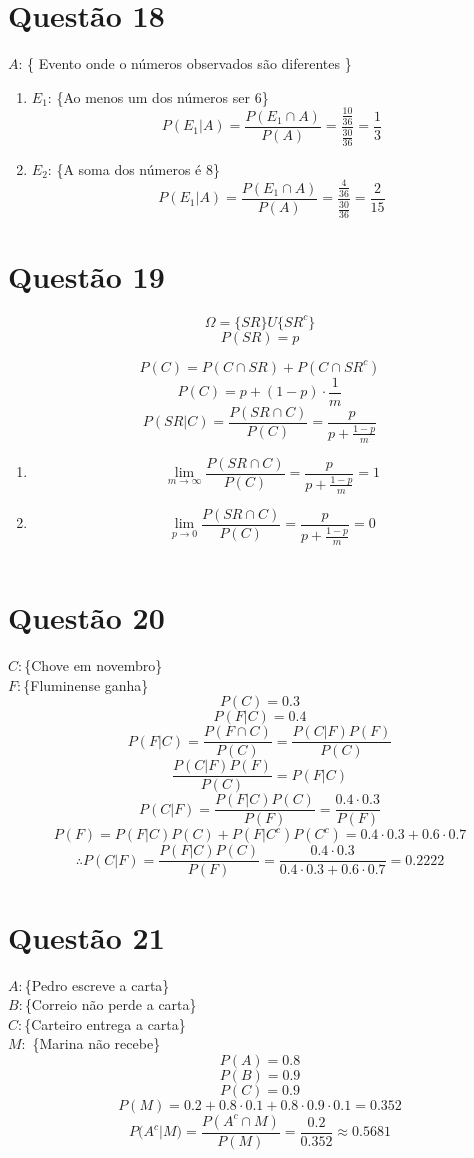 \documentclass[a4paper,12pt]{report}
\begin{document}
\section{Questão 18}
$A$: \{ Evento onde o números observados são diferentes \}\\

\begin{enumerate}[label=\alph*)]

	\item  $E_1$: \{Ao menos um dos números ser 6\}
$$P(E_1|A) = \frac{P(E_1\cap A)}{P(A)} = \frac{\frac{10}{36}}{\frac{30}{36}}=\frac{1}{3} $$
\item 
 $E_2$: \{A soma dos números é 8\}
 $$P(E_1|A) = \frac{P(E_1\cap A)}{P(A)} = \frac{\frac{4}{36}}{\frac{30}{36}}=\frac{2}{15} $$
\end{enumerate}

\newpage 
\section{Questão 19}

$$\Omega = \{SR\}U\{SR^c\} $$
$$P(SR)= p$$

 
$$P(C) = P(C\cap SR)+P(C\cap SR^c) $$
$$P(C)= p+ (1-p)\cdot \frac{1}{m}$$
$$P(SR|C)=\frac{P(SR\cap C)}{P(C)}= \frac{p}{p+\frac{1-p}{m}}$$
\begin{enumerate}[label=\roman*)]
	\item $$\lim\limits_{m\rightarrow \infty} \frac{P(SR\cap C)}{P(C)}= \frac{p}{p+\frac{1-p}{m}} = 1 $$
	\item 
	 $$\lim\limits_{p\rightarrow 0} \frac{P(SR\cap C)}{P(C)}= \frac{p}{p+\frac{1-p}{m}} = 0 $$
	
	$$ $$
\end{enumerate}

\section{Questão 20}
$C:$\{Chove em novembro\}\\
$F:$\{Fluminense ganha\}\\
$$P(C) = 0.3 $$
$$P(F|C)=0.4 $$
$$P(F|C)=\frac{P(F\cap C)}{P(C)}=\frac{P(C|F)P(F)}{P(C)} $$
$$\frac{P(C|F)P(F)}{P(C)} =P(F|C)  $$
$$P(C|F)=\frac{P(F|C)P(C)}{P(F)} =\frac{0.4\cdot 0.3}{P(F)}$$
$$P(F) = P(F|C)P(C) + P(F|C^c)P(C^c) = 0.4\cdot 0.3 + 0.6\cdot 0.7$$
$$\therefore 
P(C|F)=\frac{P(F|C)P(C)}{P(F)} =\frac{0.4\cdot 0.3}{0.4\cdot 0.3 + 0.6\cdot 0.7} = 0.2222
 $$
\newpage

\section{Questão 21}
$A:$\{Pedro escreve a carta\}\\
$B:$\{Correio não perde a carta\}\\
$C:$\{Carteiro entrega a carta\}\\
$M:$ \{Marina não recebe\}
$$P(A)=0.8 $$
$$P(B)=0.9 $$
$$P(C)=0.9 $$
$$P(M)=0.2  + 0.8\cdot 0.1 + 0.8\cdot 0.9 \cdot 0.1=0.352 $$
$$P\bigg(A^c|M\bigg) = \frac{P(A^c\cap M)}{P(M)} =  \frac{0.2}{0.352}\approx 0.5681$$
\newpage
\end{document}
